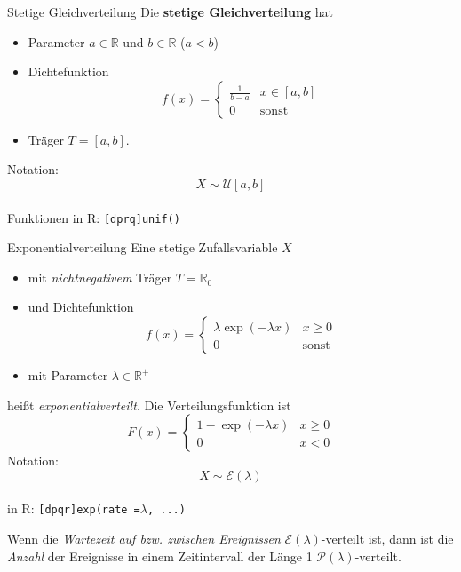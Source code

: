 \documentclass[
  10pt,
  ignorenonframetext,
]{beamer}
\providecommand{\tightlist}{%
  \setlength{\itemsep}{0pt}\setlength{\parskip}{0pt}}
\begin{document}
\begin{frame}[fragile]{Stetige Gleichverteilung}
\protect\hypertarget{stetige-gleichverteilung}{}
Die \textbf{stetige Gleichverteilung} hat

\begin{itemize}
\tightlist
\item
  Parameter \(a \in \mathbb{R}\) und \(b \in \mathbb{R}\) (\(a < b\))
\item
  Dichtefunktion
  \[f(x) = \begin{cases} \frac{1}{b-a} & x \in [a, b] \\ 0 & \text{sonst} \end{cases}\]
\item
  Träger \(T = [a,b]\).\\
\end{itemize}

Notation: \[X \sim \mathcal{U}[a, b]\]\\

Funktionen in R: \texttt{{[}dprq{]}unif()}
\end{frame}

\begin{frame}[fragile]{Exponentialverteilung}
\protect\hypertarget{exponentialverteilung}{}
Eine stetige Zufallsvariable \(X\)

\begin{itemize}
\tightlist
\item
  mit \emph{nichtnegativem} Träger \(T = \mathbb{R}^+_0\)
\item
  und Dichtefunktion \[
  f(x) = \begin{cases}
  \lambda \exp (-\lambda x) & x \geq 0 \\
  0            & \text{sonst}
  \end{cases}
  \]
\item
  mit Parameter \(\lambda \in \mathbb{R}^+\)
\end{itemize}

heißt \emph{exponentialverteilt.} Die Verteilungsfunktion ist \[
F(x) =  \begin{cases}
1 - \exp (-\lambda x)   &  x \geq 0 \\
0           &  x < 0
 \end{cases}
\] Notation: \[X \sim \mathcal{E}(\lambda)\]\\

in R: \texttt{{[}dpqr{]}exp(rate\ =}\(\lambda\)\texttt{,\ ...)}

Wenn die \emph{Wartezeit auf bzw. zwischen Ereignissen}
\(\mathcal{E}(\lambda)\)-verteilt ist, dann ist die \emph{Anzahl} der
Ereignisse in einem Zeitintervall der Länge 1
\(\mathcal{P}(\lambda)\)-verteilt.
\end{frame}
\end{document}
